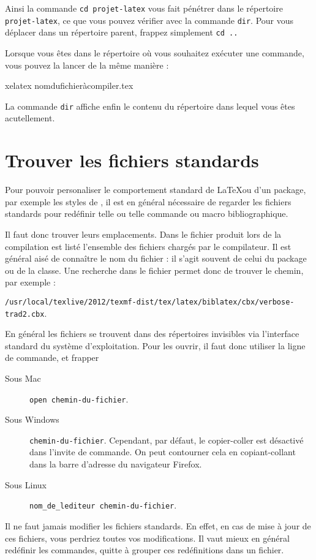 Ainsi la commande \verb|cd projet-latex| vous fait pénétrer dans le
répertoire \verb|projet-latex|, ce que vous pouvez vérifier avec la
commande \verb|dir|. Pour vous déplacer dans un répertoire parent, frappez
simplement \verb|cd ..|

Lorsque vous êtes dans le répertoire où vous souhaitez exécuter une
commande, vous pouvez la lancer de la même manière :

\begin{bashcode}
xelatex nomdufichieràcompiler.tex
\end{bashcode}

La commande \verb|dir| affiche enfin le contenu du répertoire dans lequel vous êtes acutellement.

\section{Trouver les fichiers standards}\label{trouverfichier}

Pour pouvoir personaliser le comportement standard de \LaTeX ou d'un package, par exemple les styles de , il est en général nécessaire de regarder les fichiers standards pour redéfinir telle ou telle commande ou macro bibliographique. 

Il faut donc trouver leurs emplacements. Dans le fichier  produit lors de la compilation est listé l'ensemble des fichiers chargés par le compilateur. Il est général aisé de connaître le nom du fichier : il s'agit souvent de celui du package ou de la classe. Une recherche dans le fichier permet donc de trouver le chemin, par exemple : 

\noindent\verb|/usr/local/texlive/2012/texmf-dist/tex/latex/biblatex/cbx/verbose-trad2.cbx|.

En général les fichiers se trouvent dans des répertoires invisibles via l'interface standard du système d'exploitation. Pour les ouvrir, il faut donc utiliser la ligne de commande, et frapper 
\begin{description}
\item[Sous Mac]\verb|open chemin-du-fichier|.
\item[Sous Windows] \verb|chemin-du-fichier|.  Cependant, par défaut, le copier-coller est désactivé  dans l'invite de commande. On peut contourner cela en copiant-collant dans la barre d'adresse du navigateur Firefox.
\item[Sous Linux] \verb|nom_de_lediteur chemin-du-fichier|.
\end{description}
\begin{attention}
Il ne faut jamais modifier les fichiers standards. En effet, en cas de mise à jour de ces fichiers, vous perdriez toutes vos modifications. Il vaut mieux en général redéfinir les commandes, quitte à grouper ces redéfinitions dans un fichier.
\end{attention}

